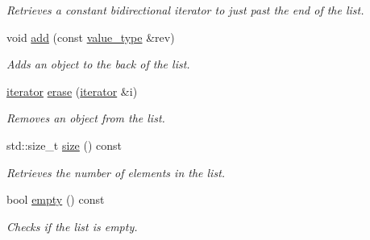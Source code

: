\begin{DoxyCompactItemize}
\begin{DoxyCompactList}\small\item\em \-Retrieves a constant bidirectional iterator to just past the end of the list. \end{DoxyCompactList}\item 
void \hyperlink{classLibWheel_1_1WaitList_ac2f908037eee4e5c5d6553c217647c1b}{add} (const \hyperlink{classLibWheel_1_1WaitList_a1ff6e1745f202171e2d3a17a114c58af}{value\-\_\-type} \&rev)
\begin{DoxyCompactList}\small\item\em \-Adds an object to the back of the list. \end{DoxyCompactList}\item 
\hyperlink{classLibWheel_1_1WaitList_a197f2582847b549a89b833d2eb153b1c}{iterator} \hyperlink{classLibWheel_1_1WaitList_a975195ad3a9b2c38453291a1633cf78b}{erase} (\hyperlink{classLibWheel_1_1WaitList_a197f2582847b549a89b833d2eb153b1c}{iterator} \&i)
\begin{DoxyCompactList}\small\item\em \-Removes an object from the list. \end{DoxyCompactList}\item 
std\-::size\-\_\-t \hyperlink{classLibWheel_1_1WaitList_a21cf29a4959829a276799c989995c98c}{size} () const 
\begin{DoxyCompactList}\small\item\em \-Retrieves the number of elements in the list. \end{DoxyCompactList}\item 
bool \hyperlink{classLibWheel_1_1WaitList_abaf7e9847f95400ae461f6d76f68e531}{empty} () const 
\begin{DoxyCompactList}\small\item\em \-Checks if the list is empty. \end{DoxyCompactList}\end{DoxyCompactItemize}

